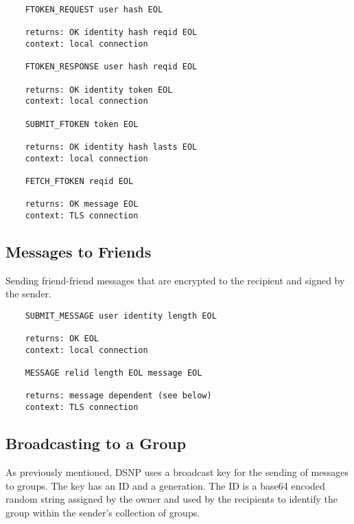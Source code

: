 \documentclass[letterpaper,11pt,oneside]{article}
\begin{document}
\vspace{10pt}
\begin{verbatim}
    FTOKEN_REQUEST user hash EOL 

    returns: OK identity hash reqid EOL
    context: local connection

    FTOKEN_RESPONSE user hash reqid EOL 

    returns: OK identity token EOL
    context: local connection

    SUBMIT_FTOKEN token EOL 

    returns: OK identity hash lasts EOL
    context: local connection

    FETCH_FTOKEN reqid EOL

    returns: OK message EOL
    context: TLS connection
\end{verbatim}

\subsection{Messages to Friends}

Sending friend-friend messages that are encrypted to the recipient and signed
by the sender. 

\vspace{10pt}
\begin{verbatim}
    SUBMIT_MESSAGE user identity length EOL

    returns: OK EOL
    context: local connection

    MESSAGE relid length EOL message EOL

    returns: message dependent (see below)
    context: TLS connection
\end{verbatim}

\subsection{Broadcasting to a Group}

As previously mentioned, DSNP uses a broadcast key for the sending of messages
to groups. The key has an ID and a generation. The ID is a base64 encoded
random string assigned by the owner and used by the recipients to identify the
group within the sender's collection of groups.
\end{document}
